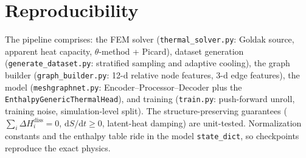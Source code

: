 \documentclass[11pt]{article}
\newcommand{\dd}{\mathrm{d}}
\theoremstyle{definition}
\begin{document}
\section*{Reproducibility}
The pipeline comprises: the FEM solver (\texttt{thermal\_solver.py}: Goldak source,
apparent heat capacity, $\theta$-method + Picard), dataset generation
(\texttt{generate\_dataset.py}: stratified sampling and adaptive cooling), the graph
builder (\texttt{graph\_builder.py}: 12-d relative node features, 3-d edge features), the
model (\texttt{meshgraphnet.py}: Encoder--Processor--Decoder plus the
\texttt{EnthalpyGenericThermalHead}), and training (\texttt{train.py}: push-forward
unroll, training noise, simulation-level split). The structure-preserving guarantees
($\sum_i\Delta H^{\mathrm{diss}}_i=0$, $\dd S/\dd t\ge0$, latent-heat damping) are
unit-tested. Normalization constants and the enthalpy table ride in the model
\texttt{state\_dict}, so checkpoints reproduce the exact physics.
\end{document}
